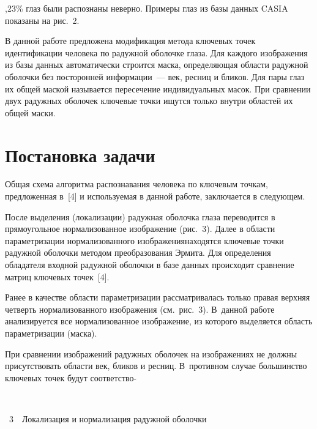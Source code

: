 \begin{multicols}{2}
\addtocounter{figure}{1}

,23\% глаз были распознаны неверно. 
Примеры глаз из базы данных CASIA показаны на рис.~2.

В данной работе предложена модификация метода ключевых точек 
идентификации человека по радужной оболочке глаза. Для каждого изображения 
из базы данных автоматически строится маска, определяющая области радужной 
оболочки без посторонней информации~--- век, ресниц и бликов. Для пары глаз их 
общей маской называется пересечение индивидуальных масок. При сравнении 
двух радужных оболочек ключевые точки ищутся только внутри областей их 
общей маски.

\vspace*{-3pt}

\section{Постановка задачи}

Общая схема алгоритма распознавания человека по ключевым точкам, 
предложенная в~[4] и используемая в данной работе, заключается в следующем.

После выделения (локализации) радужная оболочка глаза переводится в 
прямоугольное нормализованное изображение (рис.~3). Далее в об\-ласти 
параметризации нормализованного изображения\linebreak находятся ключевые точки 
радужной оболочки методом преобразования Эрмита. Для определения обладателя 
входной радужной оболочки в базе данных происходит сравнение матриц 
ключевых точек~[4].

Ранее в качестве области параметризации рассматривалась только правая верхняя 
четверть нормализованного изображения (см.\ рис.~3). В~данной работе анализируется 
все нормализованное изображение, из которого выделяется область 
параметризации (маска).

При сравнении изображений радужных оболочек на изображениях не должны 
присутствовать  области век, бликов и ресниц. В~противном случае большинство 
ключевых точек будут соответство-\linebreak
\begin{center} %
\vspace*{3pt}
\mbox{%
\epsfxsize=78mm
}
\end{center}
\vspace*{3pt}
{{\figurename~3}\ \ \small{Локализация и нормализация радужной оболочки}}


\end{multicols}
